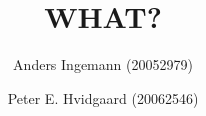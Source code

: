 \documentclass[12pt,a4paper]{report}
\title{WHAT?}
\author{Anders Ingemann (20052979) \and Peter E. Hvidgaard (20062546)}
\begin{document}
\maketitle
\newpage\mbox{}\newpage






\end{document}
